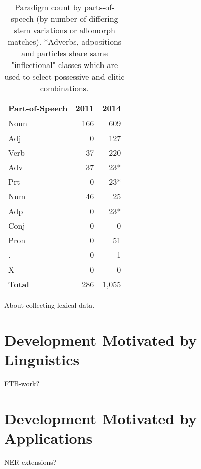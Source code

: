 \documentclass[11pt]{article}
\begin{document}
\begin{table}[h]
    \begin{center}
        \begin{tabular}{|l|rr|}
            \hline
            \bf Part-of-Speech & \bf 2011 & \bf 2014 \\
            \hline
            \sc Noun           & 166      & 609 \\
            \sc Adj            & 0        & 127 \\
            \sc Verb           & 37       & 220 \\
            \sc Adv            & 37       & 23* \\
            \sc Prt            & 0        & 23* \\
            \sc Num            & 46       & 25 \\
            \sc Adp            & 0        & 23* \\
            \sc Conj           & 0        & 0 \\
            \sc Pron           & 0        & 51 \\
            \sc .              & 0        & 1  \\
            \sc X              & 0        & 0 \\
            \hline
            \bf Total          & 286      & 1,055 \\
            \hline
        \end{tabular}
    \end{center}
    \caption{Paradigm count by parts-of-speech (by number of differing
    stem variations or allomorph matches). *Adverbs, adpositions and particles
    share same "inflectional" classes which are used to select possessive and
    clitic combinations.}
\end{table}

About collecting lexical data.

\section{Development Motivated by Linguistics}

FTB-work?

\section{Development Motivated by Applications}

NER extensions?
\end{document}
